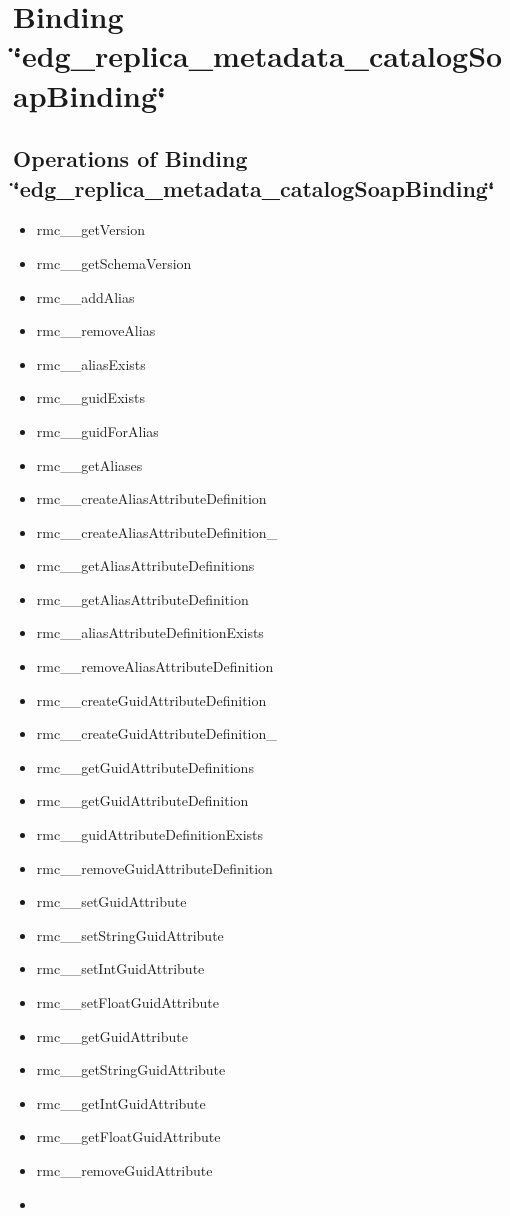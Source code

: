 \section{Binding \char`\"{}edg\_\-replica\_\-metadata\_\-catalog\-Soap\-Binding\char`\"{}}\label{edg_replica_metadata_catalogSoapBinding}
\subsection{Operations of Binding  \char`\"{}edg\_\-replica\_\-metadata\_\-catalog\-Soap\-Binding\char`\"{}}\label{edg_replica_metadata_catalogSoapBinding_edg_replica_metadata_catalogSoapBinding_operations}
\begin{itemize}
\item rmc\_\-\_\-get\-Version\item rmc\_\-\_\-get\-Schema\-Version\item rmc\_\-\_\-add\-Alias\item rmc\_\-\_\-remove\-Alias\item rmc\_\-\_\-alias\-Exists\item rmc\_\-\_\-guid\-Exists\item rmc\_\-\_\-guid\-For\-Alias\item rmc\_\-\_\-get\-Aliases\item rmc\_\-\_\-create\-Alias\-Attribute\-Definition\item rmc\_\-\_\-create\-Alias\-Attribute\-Definition\_\-\item rmc\_\-\_\-get\-Alias\-Attribute\-Definitions\item rmc\_\-\_\-get\-Alias\-Attribute\-Definition\item rmc\_\-\_\-alias\-Attribute\-Definition\-Exists\item rmc\_\-\_\-remove\-Alias\-Attribute\-Definition\item rmc\_\-\_\-create\-Guid\-Attribute\-Definition\item rmc\_\-\_\-create\-Guid\-Attribute\-Definition\_\-\item rmc\_\-\_\-get\-Guid\-Attribute\-Definitions\item rmc\_\-\_\-get\-Guid\-Attribute\-Definition\item rmc\_\-\_\-guid\-Attribute\-Definition\-Exists\item rmc\_\-\_\-remove\-Guid\-Attribute\-Definition\item rmc\_\-\_\-set\-Guid\-Attribute\item rmc\_\-\_\-set\-String\-Guid\-Attribute\item rmc\_\-\_\-set\-Int\-Guid\-Attribute\item rmc\_\-\_\-set\-Float\-Guid\-Attribute\item rmc\_\-\_\-get\-Guid\-Attribute\item rmc\_\-\_\-get\-String\-Guid\-Attribute\item rmc\_\-\_\-get\-Int\-Guid\-Attribute\item rmc\_\-\_\-get\-Float\-Guid\-Attribute\item rmc\_\-\_\-remove\-Guid\-Attribute\item 
\end{itemize}
